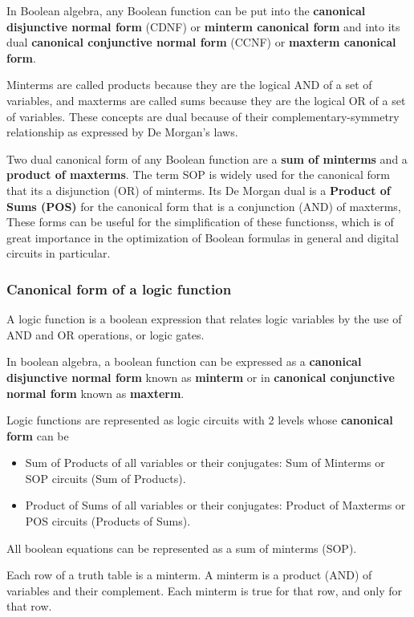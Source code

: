 {In Boolean algebra, any Boolean function can be put into the \textbf{canonical disjunctive normal form} (CDNF) or \textbf{minterm canonical form} and into its dual \textbf{canonical conjunctive normal form} (CCNF) or \textbf{maxterm canonical form}.

Minterms are called products because they are the logical AND of a set of variables, and maxterms are called sums because they are the logical OR of a set of variables. These concepts are dual because of their complementary-symmetry relationship as expressed by De Morgan's laws.

Two dual canonical form of any Boolean function are a \textbf{sum of minterms} and a \textbf{product of maxterms}. The term SOP is widely used for the canonical form that its a disjunction (OR) of minterms. Its De Morgan dual is a \textbf{Product of Sums (POS)} for the canonical form that is a conjunction (AND) of maxterms, These forms can be useful for the simplification of these functionss, which is of great importance in the optimization of Boolean formulas in general and digital circuits in particular.


\subsubsection{Canonical form of a logic function}
\begin{definition}
    A logic function is a boolean expression that relates logic variables by the use of AND and OR operations, or logic gates.
\end{definition}

In boolean algebra, a boolean function can be expressed as a \textbf{canonical disjunctive normal form} known as \textbf{minterm} or in \textbf{canonical conjunctive normal form} known as \textbf{maxterm}.

Logic functions are represented as logic circuits with 2 levels whose \textbf{canonical form} can be
\begin{itemize}
    \item Sum of Products of all variables or their conjugates: Sum of Minterms or SOP circuits (Sum of Products).
    \item Product of Sums of all variables or their conjugates: Product of Maxterms or POS circuits (Products of Sums).
\end{itemize}
\begin{note}
    All boolean equations can be represented as a sum of minterms (SOP).
\end{note}
\begin{definition}
    Each row of a truth table is a minterm. A minterm is a product (AND) of variables and their complement. Each minterm is true for that row, and only for that row.
\end{definition}

}
